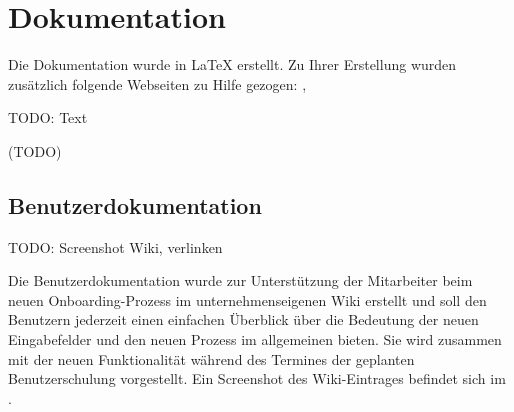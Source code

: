 \section{Dokumentation}
\label{sec:Dokumentation}
Die Dokumentation wurde in \LaTeX{ } erstellt. Zu Ihrer Erstellung wurden zusätzlich folgende Webseiten zu Hilfe gezogen: \cite{texstudio}, \cite{texbibtut}

TODO: Text

(TODO)


\subsection{Benutzerdokumentation}
\label{subsec:Benutzerdokumentation}

TODO: Screenshot Wiki, verlinken

Die Benutzerdokumentation wurde zur Unterstützung der Mitarbeiter beim neuen Onboarding-Prozess im unternehmenseigenen Wiki erstellt und soll den Benutzern jederzeit einen einfachen Überblick über die Bedeutung der neuen Eingabefelder und den neuen Prozess im allgemeinen bieten. Sie wird zusammen mit der neuen Funktionalität während des Termines der geplanten Benutzerschulung vorgestellt. Ein Screenshot des Wiki-Eintrages befindet sich im .

